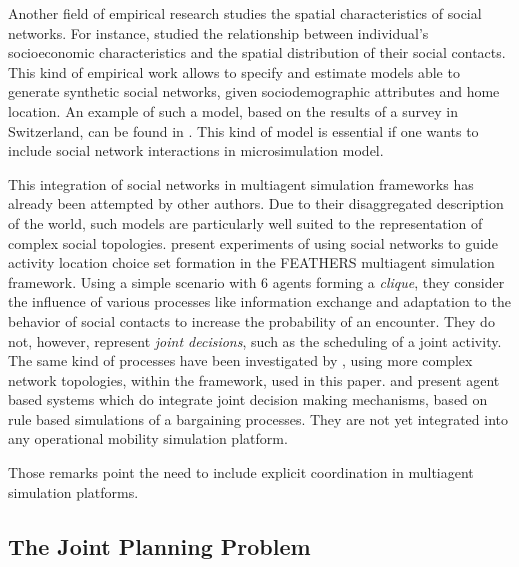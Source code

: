 {Another field of empirical research studies the spatial characteristics of social networks.
For instance,  studied the relationship between individual's socioeconomic
characteristics and the spatial distribution of their social contacts.
This kind of empirical work allows to specify and estimate models able to generate synthetic social networks,
given sociodemographic attributes and home location.
An example of such a model, based on the results of a survey in Switzerland,
can be found in .
This kind of model is essential if one wants to include social network interactions
in microsimulation model.

This integration of social networks in multiagent simulation frameworks has already
been attempted by other authors.
Due to their disaggregated description of the world,
such models are particularly well suited to the representation of complex social topologies.
 present experiments of using social networks
to guide activity location choice set formation in the FEATHERS multiagent simulation framework.
Using a simple scenario with 6 agents forming a \emph{clique},
they consider the influence of various processes like
information exchange and adaptation to the behavior of social contacts to increase the probability
of an encounter.
They do not, however, represent \emph{joint decisions}, such as the scheduling of a joint activity.
The same kind of processes have been investigated by ,
using more complex network topologies,
within the \matsim framework, used in this paper.
and 
present agent based systems which do integrate
joint decision making mechanisms,
based on rule based simulations of a bargaining processes.
They are not yet integrated into
any operational mobility simulation platform.

Those remarks point the need
to include explicit coordination in multiagent simulation platforms.

\subsection{The Joint Planning Problem}

}
